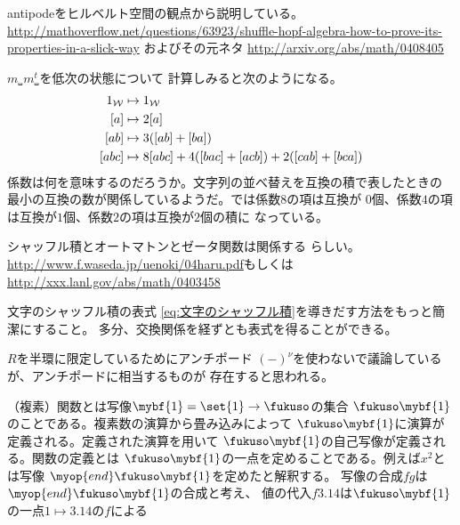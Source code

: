 	\begin{todo}[やること]\label{todo:やること} %
		\begin{description}\setlength{\itemsep}{-1mm} %
			\item[Hopf代数] antipodeをヒルベルト空間の観点から説明している。
			\url{http://mathoverflow.net/questions/63923/shuffle-hopf-algebra-how-to-prove-its-properties-in-a-slick-way}
			およびその元ネタ
			\url{http://arxiv.org/abs/math/0408405}
			\item[エルミート作用素] $m_\shuffle m_\shuffle^t$を低次の状態について
			計算しみると次のようになる。
			\begin{equation*}\begin{split} %
				\wordu{} &\mapsto \wordu{} \\
				\word{a} &\mapsto 2\word{a} \\
				\word{ab} &\mapsto 3(\word{ab} + \word{ba}) \\
				\word{abc} &\mapsto 8\word{abc} + 4(\word{bac} + \word{acb}) 
					+ 2(\word{cab} + \word{bca})\\
			\end{split}\end{equation*} %
			係数は何を意味するのだろうか。文字列の並べ替えを互換の積で表したときの
			最小の互換の数が関係しているようだ。では係数$8$の項は互換が
			$0$個、係数$4$の項は互換が$1$個、係数$2$の項は互換が$2$個の積に
			なっている。
			\item[ゼータ関数] シャッフル積とオートマトンとゼータ関数は関係する
			らしい。\url{http://www.f.waseda.jp/uenoki/04haru.pdf}もしくは
			\url{http://xxx.lanl.gov/abs/math/0403458}
			\item[ブラッシュアップ] 文字のシャッフル積の表式
			\eqref{eq:文字のシャッフル積}を導きだす方法をもっと簡潔にすること。
			多分、交換関係を経ずとも表式を得ることができる。
			\item[Hopf代数との関係] $R$を半環に限定しているためにアンチポード
			$(-)^\nu$を使わないで議論しているが、アンチポードに相当するものが
			存在すると思われる。
			\item[関数] （複素）関数とは写像$\mybf{1}=\set{1}\to\fukuso$の集合
			$\fukuso\mybf{1}$のことである。複素数の演算から畳み込みによって
			$\fukuso\mybf{1}$に演算が定義される。定義された演算を用いて
			$\fukuso\mybf{1}$の自己写像が定義される。関数の定義とは
			$\fukuso\mybf{1}$の一点を定めることである。例えば$x^2$とは写像
			$\myop{end}\fukuso\mybf{1}$を定めたと解釈する。
			写像の合成$fg$は$\myop{end}\fukuso\mybf{1}$の合成と考え、
			値の代入$f3.14$は$\fukuso\mybf{1}$の一点$1\mapsto3.14$の$f$による

\end{description}
\end{todo}
